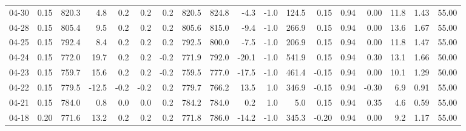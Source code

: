 \begin{threeparttable}
{\begin{tabular}{lrrrrrrrrrrrrrrrrr}
  04-30 &     0.15 & 820.3 &               4.8 &               0.2 &                0.2 &                0.2 & 820.5 & 824.8 &       -4.3 &                     -1.0 &               124.5 &       0.15 &      0.94 &           0.00 &             11.8 &            1.43 &                  55.00 \\
  04-28 &     0.15 & 805.4 &               9.5 &               0.2 &                0.2 &                0.2 & 805.6 & 815.0 &       -9.4 &                     -1.0 &               266.9 &       0.15 &      0.94 &           0.00 &             13.6 &            1.67 &                  55.00 \\
  04-25 &     0.15 & 792.4 &               8.4 &               0.2 &                0.2 &                0.2 & 792.5 & 800.0 &       -7.5 &                     -1.0 &               206.9 &       0.15 &      0.94 &           0.00 &             11.8 &            1.47 &                  55.00 \\
  04-24 &     0.15 & 772.0 &              19.7 &               0.2 &                0.2 &               -0.2 & 771.9 & 792.0 &      -20.1 &                     -1.0 &               541.9 &       0.15 &      0.94 &           0.30 &             13.1 &            1.66 &                  50.00 \\
  04-23 &     0.15 & 759.7 &              15.6 &               0.2 &                0.2 &               -0.2 & 759.5 & 777.0 &      -17.5 &                     -1.0 &               461.4 &      -0.15 &      0.94 &           0.00 &             10.1 &            1.29 &                  50.00 \\
  04-22 &     0.15 & 779.5 &             -12.5 &              -0.2 &               -0.2 &                0.2 & 779.7 & 766.2 &       13.5 &                      1.0 &               346.9 &      -0.15 &      0.94 &          -0.30 &              6.9 &            0.91 &                  55.00 \\
  04-21 &     0.15 & 784.0 &               0.8 &               0.0 &                0.0 &                0.2 & 784.2 & 784.0 &        0.2 &                      1.0 &                 5.0 &       0.15 &      0.94 &           0.35 &              4.6 &            0.59 &                  55.00 \\
  04-18 &     0.20 & 771.6 &              13.2 &               0.2 &                0.2 &                0.2 & 771.8 & 786.0 &      -14.2 &                     -1.0 &               345.3 &      -0.20 &      0.94 &           0.00 &              9.2 &            1.17 &                  55.00 \\

\end{tabular}}
\end{threeparttable}
